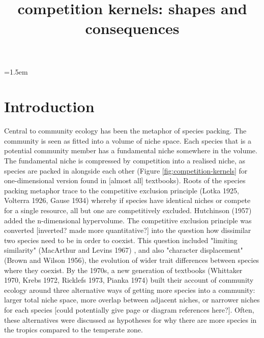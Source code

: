\documentclass[a4paper,11pt]{article}
\title{competition kernels: shapes and consequences}
\author{}
\date{}
\affiliation{}
\begin{document}

\parindent=1.5em
\addtolength{\parskip}{.3em}


\section{Introduction}


Central to community ecology has been the metaphor of species packing. The community is seen as fitted into a volume of niche space. Each species that is a potential community member has a fundamental niche somewhere in the volume. The fundamental niche is compressed by competition into a realised niche, as species are packed in alongside each other (Figure \ref{fig:competition-kernels} for one-dimensional version found in [almost all] textbooks). Roots of the species packing metaphor trace to the competitive exclusion principle (Lotka 1925, Volterra 1926, Gause 1934) whereby if species have identical niches or compete for a single resource, all but one are competitively excluded. Hutchinson (1957) added the n-dimensional hypervolume. The  competitive exclusion principle was converted [inverted? made more quantitative?] into the question how dissimilar two species need to be in order to coexist. This question included "limiting similarity" (MacArthur and Levins 1967) \citep{MacArthur-1967}, and also "character displacement" (Brown and Wilson 1956), the evolution of wider trait differences between species where they coexist. By the 1970s, a new generation of textbooks (Whittaker 1970, Krebs 1972, Ricklefs 1973, Pianka 1974) built their account of community ecology around three alternative ways of getting more species into a community: larger total niche space, more overlap between adjacent niches, or narrower niches for each species [could potentially give page or diagram references here?]. Often, these alternatives were discussed as hypotheses for why there are more species in the tropics compared to the temperate zone. 

\end{document}

